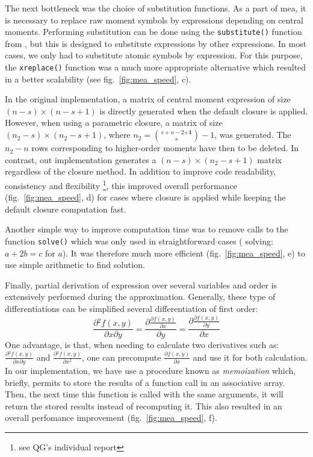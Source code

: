 The next bottleneck was the choice of substitution functions.
As a part of \gls{mea}, it is necessary to replace raw moment symbols by expressions depending on central moments.
Performing substitution can be done using the \texttt{substitute()} function from \sympy, but this is designed to substitute expressions by other expressions.
In most cases, we only had to substitute atomic symbols by expression.
For this purpose, the  \texttt{xreplace()} function was a much more appropriate alternative which resulted in a better scalability (see fig.~\ref{fig:mea_speed}, c).

In the original implementation, a matrix of central moment expression of size $(n-s) \times (n-s + 1)$ is directly generated when the default closure is applied.
However, when using a parametric closure, a matrix of size $(n_2-s) \times (n_2-s + 1)$, where $n_2={{s+o-2 \mathbf{+1}} \choose {s}} -1$, was generated.
The $n_2 - n$ rows corresponding to higher-order moments have then to be deleted.
In contrast, out implementation generates a $(n-s) \times (n_2-s + 1)$ matrix regardless of the closure method.
In addition to improve code readability, consistency and flexibility \footnote{see QG's individual report}, this improved overall performance (fig.~\ref{fig:mea_speed}, d) for cases where closure is applied while keeping the default closure computation fast.

Another simple way to improve computation time was to remove calls to the function \texttt{solve()} which was only used in straightforward cases (\eg{} solving: $a + 2b = c$ for $a$).
It was therefore much more efficient (fig.~\ref{fig:mea_speed}, e) to use simple arithmetic to find solution.

Finally, partial derivation of expression over several variables and order is extensively performed during the approximation.
Generally, these type of differentiations can be simplified several differentiation of first order:
\begin{equation}
\frac{\partial{} ^ 2 f(x,y)}{\partial x \partial y}  =
\frac{\partial{} \frac{\partial{} f(x,y)}{\partial x}}{\partial y} =
\frac{\partial{} \frac{\partial{} f(x,y)}{\partial{} y}}{\partial{} x}
\end{equation}
One advantage, is that, when needing to calculate two derivatives such as:  $\frac{\partial{} ^ 2 f(x,y)}{\partial{} x \partial{} y}$ and $\frac{\partial{} ^ 2 f(x,y)}{\partial{} x^2}$, 
one can precompute $\frac{\partial{} f(x,y)}{\partial{} x}$ and use it for both calculation.
In our implementation, we have use a procedure known as \emph{memoization} which, briefly, permits to store the results of a function call in an associative array.
Then, the next time this function is called with the same arguments, it will return the stored results instead of recomputing it.
This also resulted in an overall perfomance improvement (fig.~\ref{fig:mea_speed}, f).

